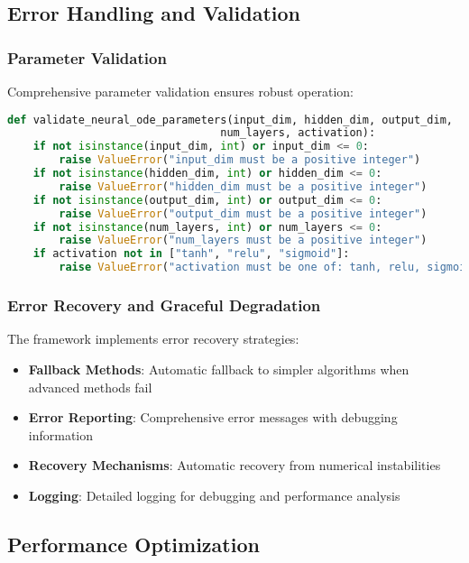 \subsection{Error Handling and Validation}

\subsubsection{Parameter Validation}

Comprehensive parameter validation ensures robust operation:

\begin{lstlisting}[language=Python, caption=Parameter Validation Example]
def validate_neural_ode_parameters(input_dim, hidden_dim, output_dim, 
                                 num_layers, activation):
    if not isinstance(input_dim, int) or input_dim <= 0:
        raise ValueError("input_dim must be a positive integer")
    if not isinstance(hidden_dim, int) or hidden_dim <= 0:
        raise ValueError("hidden_dim must be a positive integer")
    if not isinstance(output_dim, int) or output_dim <= 0:
        raise ValueError("output_dim must be a positive integer")
    if not isinstance(num_layers, int) or num_layers <= 0:
        raise ValueError("num_layers must be a positive integer")
    if activation not in ["tanh", "relu", "sigmoid"]:
        raise ValueError("activation must be one of: tanh, relu, sigmoid")
\end{lstlisting}

\subsubsection{Error Recovery and Graceful Degradation}

The framework implements error recovery strategies:

\begin{itemize}
    \item \textbf{Fallback Methods}: Automatic fallback to simpler algorithms when advanced methods fail
    \item \textbf{Error Reporting}: Comprehensive error messages with debugging information
    \item \textbf{Recovery Mechanisms}: Automatic recovery from numerical instabilities
    \item \textbf{Logging}: Detailed logging for debugging and performance analysis
\end{itemize}

\subsection{Performance Optimization}

